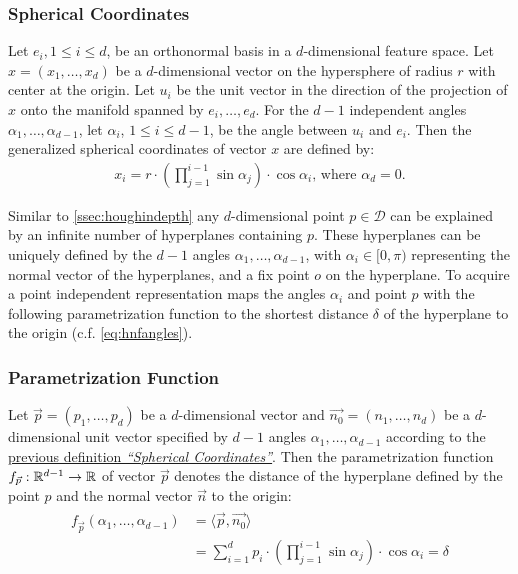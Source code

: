 \subsubsection*{Spherical Coordinates}\label{def:spherecord}
Let $e_i, 1 \leq i \leq d$, be an orthonormal basis in a $d$-dimensional feature space. Let $x=(x_1,\dotsc,x_d)$ be a $d$-dimensional vector on the hypersphere of radius $r$ with center at the origin. Let $u_i$ be the unit vector in the direction of the projection of $x$ onto the manifold spanned by $e_i,\dotsc,e_d$. For the $d-1$ independent angles $\alpha_1,\dotsc,\alpha_{d-1}$, let $\alpha_i$, $1 \leq i \leq d-1$, be the angle between $u_i$ and $e_i$. Then the generalized spherical coordinates of vector $x$ are defined by:
\begin{align}
    x_i = r \cdot (\prod_{j=1}^{i-1}\sin{\alpha_j}) \cdot \cos{\alpha_i}\text{, where } \alpha_d = 0.
\end{align}

Similar to \autoref{ssec:houghindepth} any $d$-dimensional point $p \in \mathcal{D}$ can be explained by an infinite number of hyperplanes containing $p$. These hyperplanes can be uniquely defined by the $d-1$ angles $\alpha_1,\dotsc,\alpha_{d-1}$, with $\alpha_i \in [0,\pi)$ representing the normal vector of the hyperplanes, and a fix point $o$ on the hyperplane. To acquire a point independent representation \textcite{CASHachtert2008robust} maps the angles $\alpha_i$ and point $p$ with the following parametrization function to the shortest distance $\delta$ of the hyperplane to the origin (c.f. \ref{eq:hnfangles}).

\subsubsection*{Parametrization Function}
Let $\vec{p} = (p_1,\dotsc,p_d)$ be a $d$-dimensional vector and $\vec{n_0} = (n_1,\dotsc,n_d)$ be a $d$-dimensional unit vector specified by $d-1$ angles $\alpha_1,\dotsc,\alpha_{d-1}$ according to the \hyperref[def:spherecord]{previous definition \textit{``Spherical Coordinates''}}. Then the parametrization function $f_{\vec{p}}:\mathbb{R}^{d-1} \rightarrow \mathbb{R}$ of vector $\vec{p}$ denotes the distance of the hyperplane defined by the point $p$ and the normal vector $\vec{n}$ to the origin:
\begin{align}
    \begin{split}
            f_{\vec{p}}(\alpha_1,\dotsc,\alpha_{d-1}) &= \langle \vec{p},\vec{n_0} \rangle\\
    &= \sum_{i=1}^d p_i \cdot (\prod_{j=1}^{i-1} \sin{\alpha_j}) \cdot \cos{\alpha_i}  = \delta
    \end{split}
\end{align}

